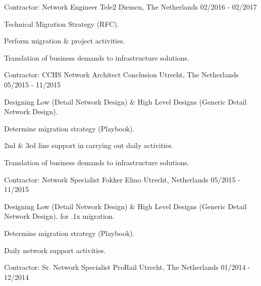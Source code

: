 \begin{cventries}
  \cventry
        {Contractor: Network Engineer} %
 	{Tele2} %
 	{Diemen, The Netherlands} %
  	{02/2016 - 02/2017} %
    {
      \begin{cvitems} %
          \item {Technical Migration Strategy (RFC).}
    \item {Perform migration \& project activities.}
    \item {Translation of business demands to infrastructure solutions.}
      \end{cvitems}
    }

  \cventry
    {Contractor: CCHS Network Architect} %
    {Conclusion} %
    {Utrecht, The Netherlands} %
    {05/2015 - 11/2015} %
    {
      \begin{cvitems} %
          \item {Designing Low (Detail Network Design) \& High Level Designs (Generic Detail Network Design).}
    \item {Determine migration strategy (Playbook).}
    \item {2nd \& 3rd line support in carrying out daily activities.} 
    \item {Translation of business demands to infrastructure solutions.}
      \end{cvitems}
    }
 \cventry
    {Contractor: Network Specialist} %
    {Fokker Elmo} %
    {Utrecht, Netherlands} %
    {05/2015 - 11/2015} %
    {
      \begin{cvitems} %
          \item {Designing Low (Detail Network Design) \& High Level Designs (Generic Detail Network Design). for .1x migration.}
    \item {Determine migration strategy (Playbook).}
    \item {Daily network support activities.}
      \end{cvitems}
    }
  \cventry
    {Contractor: Sr. Network Specialist} %
    {ProRail} %
    {Utrecht, The Netherlands} %
    {01/2014 - 12/2014} %
    {
      \begin{cvitems} %

\end{cvitems}}
\end{cventries}
